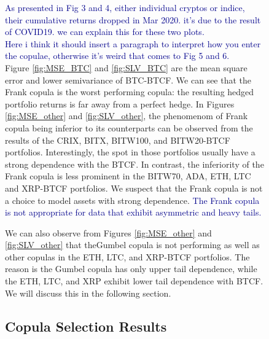 \begin{figure}[!]
\textcolor{darkblue}{As presented in Fig 3 and 4, either individual cryptos or indice, their cumulative returns dropped in Mar 2020. it's due to the result of COVID19. we can explain this for these two plots.}\\
\textcolor{darkblue}{Here i think it should insert a paragraph to interpret how you enter the copulae, otherwise it's weird that comes to Fig 5 and 6.}\\

Figure \ref{fig:MSE_BTC} and \ref{fig:SLV_BTC}  are the mean square
error and lower semivariance of BTC-BTCF. We can see that the Frank copula
is the worst performing copula: 
the resulting hedged portfolio returns is far away from a perfect
hedge. 
In Figures \ref{fig:MSE_other} and \ref{fig:SLV_other}, the phenomenom
of Frank copula being inferior to its counterparts can be observed
from the results of the CRIX, BITX, BITW100, and BITW20-BTCF
portfolios. 
Interestingly, the spot in those portfolios usually have a strong
dependence with the BTCF. 
In contrast, the inferiority of the Frank copula is less prominent in
the BITW70, ADA, ETH, LTC and XRP-BTCF portfolios. 
We suspect that the Frank copula is not a choice to model assets with
strong dependence. \textcolor{darkblue}{The Frank copula is not
  appropriate for data that exhibit asymmetric and heavy tails.}

We can also observe from Figures \ref{fig:MSE_other} and
\ref{fig:SLV_other} that theGumbel copula is not performing as well as 
other copulas in the ETH, LTC, and XRP-BTCF portfolios. 
The reason is the Gumbel copula has only upper tail dependence,
while the ETH, LTC, and XRP exhibit lower tail dependence with BTCF. 
We will discuss this in the following section. 

\subsection{Copula Selection Results}
\label{sec: copula results}



\end{figure}
